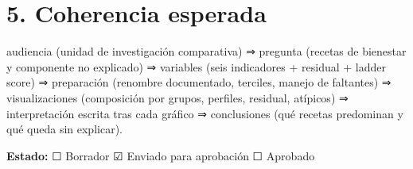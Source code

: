 \documentclass[
]{article}
\begin{document}
\section{5. Coherencia esperada}\label{coherencia-esperada}

audiencia (unidad de investigación comparativa) ⇒ pregunta (recetas de
bienestar y componente no explicado) ⇒ variables (seis indicadores +
residual + ladder score) ⇒ preparación (renombre documentado, terciles,
manejo de faltantes) ⇒ visualizaciones (composición por grupos,
perfiles, residual, atípicos) ⇒ interpretación escrita tras cada gráfico
⇒ conclusiones (qué recetas predominan y qué queda sin explicar).

\textbf{Estado:} ☐ Borrador ☑ Enviado para aprobación ☐ Aprobado
\end{document}
